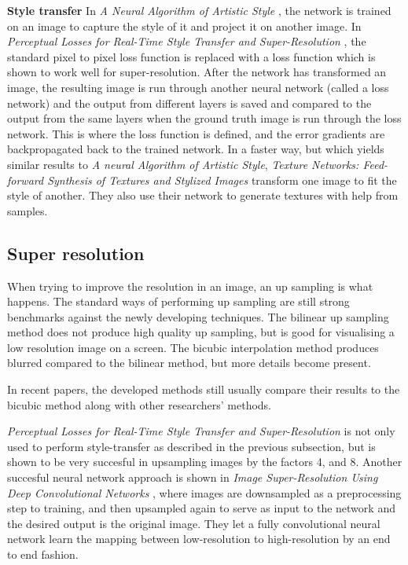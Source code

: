 \textbf{Style transfer}
In \emph{A Neural Algorithm of Artistic Style} \citep{Gatys}, the network is trained on an image to capture the style of it and project it on another image. 
In \emph{Perceptual Losses for Real-Time Style Transfer and Super-Resolution} \citep{Perceptual-losses}, the standard pixel to pixel loss function is replaced with a loss function which is shown to work well for super-resolution. After the network has transformed an image, the resulting image is run through another neural network (called a loss network) and the output from different layers is saved and compared to the output from the same layers when the ground truth image is run through the loss network. This is where the loss function is defined, and the error gradients are backpropagated back to the trained network. In a faster way, but which yields similar results to \emph{A neural Algorithm of Artistic Style}, \emph{Texture Networks: Feed-forward Synthesis of Textures and Stylized Images} \citep{Texture-net} transform one image to fit the style of another. They also use their network to generate textures with help from samples. 

\subsection{Super resolution}
When trying to improve the resolution in an image, an up sampling is what happens. The standard ways of performing up sampling are still strong benchmarks against the newly developing techniques. The bilinear up sampling method does not produce high quality up sampling, but is good for visualising a low resolution image on a screen. The bicubic interpolation method produces blurred compared to the bilinear method, but more details become present. 

In recent papers, the developed methods still usually compare their results to the bicubic method along with other researchers' methods.

\emph{Perceptual Losses for Real-Time Style Transfer and Super-Resolution} \citep{Perceptual-losses} is not only used to perform style-transfer as described in the previous subsection, but is shown to be very succesful in upsampling images by the factors 4, and 8. Another succesful neural network approach is shown in \emph{Image Super-Resolution Using Deep Convolutional Networks} \citep{SRCNN}, where images are downsampled as a preprocessing step to training, and then upsampled again to serve as input to the network and the desired output is the original image. They let a fully convolutional neural network learn the mapping between low-resolution to high-resolution by an end to end fashion. 


